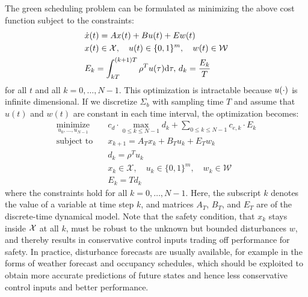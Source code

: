The green scheduling problem can be formulated as minimizing the above cost function subject to the constraints:
\begin{align*}
  & \dot{x} (t) = Ax (t) + Bu (t) + Ew (t)\\%
  & x (t) \in \mathcal{X}, \quad u(t) \in \{0,1\}^{m}, \quad w (t) \in \mathcal{W}\\%
  & E_k = \int_{kT}^{(k + 1) T} \rho^T u (\tau) \mathd \tau, \, d_k = \frac{E_k}{T}%
\end{align*}
 for all $t$ and all $k = 0, \ldots, N - 1$.
This optimization is intractable because $u (\cdot)$ is infinite
dimensional.
If we discretize $\Sigma_b$ with sampling time $T$ and assume that $u (t)$ and $w (t)$ are constant in each time interval, the optimization becomes:
\begin{align}
  \operatorname*{minimize}_{u_{0}, \ldots, u_{N - 1}} \quad & c_d \cdot \max_{0
  \leqslant k \leqslant N - 1} d_k + \textstyle\sum_{0 \leqslant k \leqslant N - 1}
  c_{e, k} \cdot E_k  \label{eq:MILP}\\
  \text{subject to} \quad & x_{k+1} = A_{T} x_{k} + B_{T} u_{k} + E_{T} w_{k}  \nonumber\\
  & d_k = \rho^T u_{k} \nonumber\\
  & x_{k} \in \mathcal{X}, \quad u_{k} \in \{0,1\}^{m}, \quad w_{k} \in \mathcal{W} \nonumber\\
  & E_k = T d_k \nonumber
\end{align}
where the constraints hold for all $k = 0, \ldots, N - 1$.
Here, the subscript $k$ denotes the value of a variable at time step $k$, and matrices $A_{T}$, $B_{T}$, and $E_{T}$ are of the discrete-time dynamical model.
Note that the safety condition, that $x_k$ stays inside $\mathcal{X}$ at all $k$, must be robust to the unknown but bounded disturbances $w$, and thereby results in conservative control inputs trading off performance for safety.
In practice, disturbance forecasts are usually available, for example in the forms of weather forecast and occupancy schedules, which should be exploited to obtain more accurate predictions of future states and hence less conservative control inputs and better performance.
